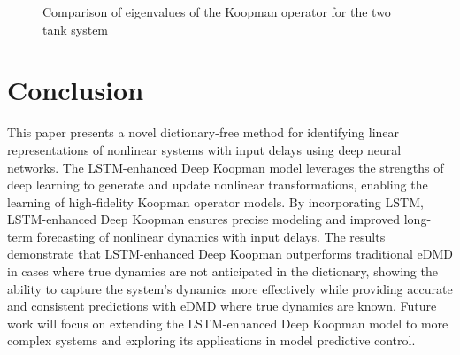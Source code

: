 \documentclass[conference]{IEEEtran}
\begin{document}
\begin{figure}[htbp]
    \caption{Comparison of eigenvalues of the Koopman operator for the two tank system}
\end{figure}

\section{Conclusion}
This paper presents a novel dictionary-free method for identifying linear representations of nonlinear systems with input delays using deep neural networks. The LSTM-enhanced Deep Koopman model leverages the strengths of deep learning to generate and update nonlinear transformations, enabling the learning of high-fidelity Koopman operator models. By incorporating LSTM, LSTM-enhanced Deep Koopman ensures precise modeling and improved long-term forecasting of nonlinear dynamics with input delays. The results demonstrate that LSTM-enhanced Deep Koopman outperforms traditional eDMD in cases where true dynamics are not anticipated in the dictionary, showing the ability to capture the system's dynamics more effectively while providing accurate and consistent predictions with eDMD where true dynamics are known. Future work will focus on extending the LSTM-enhanced Deep Koopman model to more complex systems and exploring its applications in model predictive control.



\end{document}
